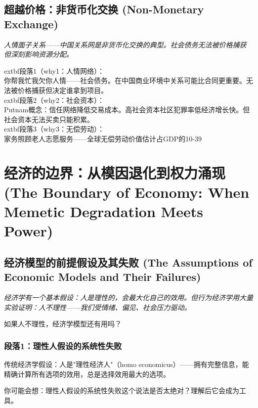 \documentclass[a4paper,12pt]{book}
\newenvironment{motivation}{\begin{tcolorbox}[colback=gray!10,colframe=gray!60,title=\textit{动机}]\small\itshape}{\end{tcolorbox}}
\newenvironment{questionbox}{\begin{tcolorbox}[colback=red!3,colframe=red!60]}{\end{tcolorbox}}
\begin{document}
\begin{motivation}
\begin{motivation}
	\subsection{超越价格：非货币化交换 (Non-Monetary Exchange)}
	\begin{motivation}人情面子关系——中国关系网是非货币化交换的典型。社会债务无法被价格捕获但深刻影响资源分配。\end{motivation}
		extbf{段落1（why1：人情网络）}：\\你帮我忙我欠你人情——社会债务。在中国商业环境中关系可能比合同更重要。无法被价格捕获但决定谁拿到项目。\\	extbf{段落2（why2：社会资本）}：\\Putnam概念：信任网络降低交易成本。高社会资本社区犯罪率低经济增长快。但社会资本无法买卖只能积累。\\	extbf{段落3（why3：无偿劳动）}：\\家务照顾老人志愿服务——全球无偿劳动价值估计占GDP的10-39%


	\section{经济的边界：从模因退化到权力涌现 (The Boundary of Economy: When Memetic Degradation Meets Power)}

	\subsection{经济模型的前提假设及其失败 (The Assumptions of Economic Models and Their Failures)}
	\begin{motivation}
		经济学有一个基本假设：人是理性的，会最大化自己的效用。但行为经济学用大量实验证明：人不理性——我们受情绪、偏见、社会压力驱动。
	\end{motivation}
	\begin{questionbox}
		如果人不理性，经济学模型还有用吗？
	\end{questionbox}

	\subsubsection*{段落1：理性人假设的系统性失败}
	传统经济学假设：人是"理性经济人"（homo economicus）——拥有完整信息，能精确计算所有选项的效用，总是选择效用最大的选项。
	\begin{tcolorbox}[colback=yellow!5, title=\textit{读者行为预测}]
		你可能会想：理性人假设的系统性失败这个说法是否太绝对？理解后它会成为工具。
	\end{tcolorbox}


\end{motivation}
\end{motivation}
\end{document}
